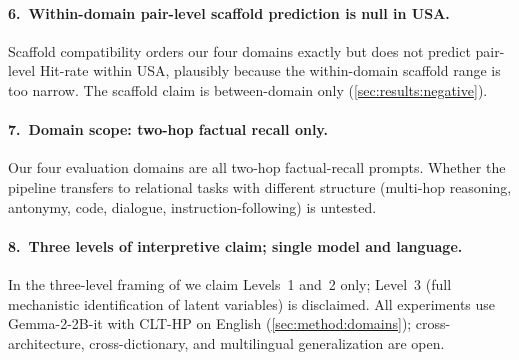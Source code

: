 \paragraph{6.\ Within-domain pair-level scaffold prediction is null in USA.}
Scaffold compatibility orders our four domains exactly but does not predict pair-level Hit-rate within USA, plausibly because the within-domain scaffold range is too narrow. The scaffold claim is between-domain only (\cref{sec:results:negative}).

\paragraph{7.\ Domain scope: two-hop factual recall only.}
Our four evaluation domains are all two-hop factual-recall prompts. Whether the pipeline transfers to relational tasks with different structure (multi-hop reasoning, antonymy, code, dialogue, instruction-following) is untested.

\paragraph{8.\ Three levels of interpretive claim; single model and language.}
In the three-level framing of \citet{geiger2025causal} we claim Levels~1 and~2 only; Level~3 (full mechanistic identification of latent variables) is disclaimed. All experiments use Gemma-2-2B-it with CLT-HP on English (\cref{sec:method:domains}); cross-architecture, cross-dictionary, and multilingual generalization are open.
